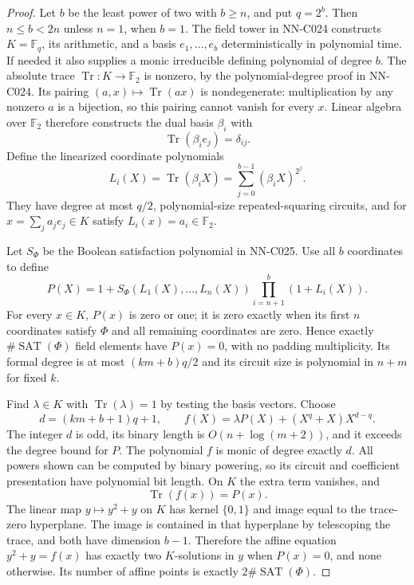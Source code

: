 \begin{proof}
Let $b$ be the least power of two with $b\geq n$, and put $q=2^b$. Then $n\leq b<2n$ unless $n=1$, when $b=1$. The field tower in NN-C024 constructs $K=\mathbb F_q$, its arithmetic, and a basis $e_1,\ldots,e_b$ deterministically in polynomial time. If needed it also supplies a monic irreducible defining polynomial of degree $b$. The absolute trace $\operatorname{Tr}:K\to\mathbb F_2$ is nonzero, by the polynomial-degree proof in NN-C024. Its pairing $(a,x)\mapsto\operatorname{Tr}(ax)$ is nondegenerate: multiplication by any nonzero $a$ is a bijection, so this pairing cannot vanish for every $x$. Linear algebra over $\mathbb F_2$ therefore constructs the dual basis $\beta_i$ with
\[
 \operatorname{Tr}(\beta_i e_j)=\delta_{ij}.
\]
Define the linearized coordinate polynomials
\[
 L_i(X)=\operatorname{Tr}(\beta_i X)
       =\sum_{j=0}^{b-1}(\beta_iX)^{2^j}.
\]
They have degree at most $q/2$, polynomial-size repeated-squaring circuits, and for $x=\sum_j a_j e_j\in K$ satisfy $L_i(x)=a_i\in\mathbb F_2$.

Let $S_\Phi$ be the Boolean satisfaction polynomial in NN-C025. Use all $b$ coordinates to define
\[
 P(X)=1+S_\Phi(L_1(X),\ldots,L_n(X))
                 \prod_{i=n+1}^{b}(1+L_i(X)).
\]
For every $x\in K$, $P(x)$ is zero or one; it is zero exactly when its first $n$ coordinates satisfy $\Phi$ and all remaining coordinates are zero. Hence exactly $\#\operatorname{SAT}(\Phi)$ field elements have $P(x)=0$, with no padding multiplicity. Its formal degree is at most $(km+b)q/2$ and its circuit size is polynomial in $n+m$ for fixed $k$.

Find $\lambda\in K$ with $\operatorname{Tr}(\lambda)=1$ by testing the basis vectors. Choose
\[
 d=(km+b+1)q+1,
 \qquad
 f(X)=\lambda P(X)+(X^q+X)X^{d-q}.
\]
The integer $d$ is odd, its binary length is $O(n+\log(m+2))$, and it exceeds the degree bound for $P$. The polynomial $f$ is monic of degree exactly $d$. All powers shown can be computed by binary powering, so its circuit and coefficient presentation have polynomial bit length. On $K$ the extra term vanishes, and
\[
           \operatorname{Tr}(f(x))=P(x).
\]
The linear map $y\mapsto y^2+y$ on $K$ has kernel $\{0,1\}$ and image equal to the trace-zero hyperplane. The image is contained in that hyperplane by telescoping the trace, and both have dimension $b-1$. Therefore the affine equation $y^2+y=f(x)$ has exactly two $K$-solutions in $y$ when $P(x)=0$, and none otherwise. Its number of affine points is exactly $2\#\operatorname{SAT}(\Phi)$.


\end{proof}
